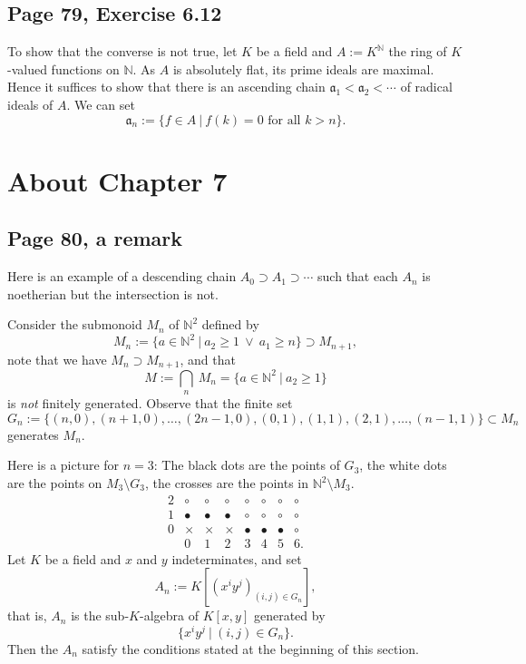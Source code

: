 \documentclass[parskip=half,fontsize=12pt]{scrartcl}%
\newcommand{\mf}{\mathfrak}
\newcommand{\aaa}{\mf a}
\begin{document}
\subsection{Page 79, Exercise 6.12}%

To show that the converse is not true, let $K$ be a field and $A:=K^{\mathbb N}$ the ring of $K$-valued functions on $\mathbb N$. As $A$ is absolutely flat, its prime ideals are maximal. Hence it suffices to show that there is an ascending chain $\aaa_1<\aaa_2<\cdots$ of radical ideals of $A$. We can set 
$$
\aaa_n:=\{f\in A\ |\ f(k)=0\text{ for all }k>n\}.
$$

\section{About Chapter 7}%

\subsection{Page 80, a remark}%

Here is an example of a descending chain $A_0\supset A_1\supset\cdots$ such that each $A_n$ is noetherian but the intersection is not.

Consider the submonoid $M_n$ of $\mathbb N^2$ defined by 
$$
M_n:=\{a\in\mathbb N^2\ |\ a_2\ge1\ \lor\ a_1\ge n\}\supset M_{n+1},
$$ 
note that we have $M_n\supset M_{n+1}$, and that 
$$
M:=\bigcap_n\ M_n=\{a\in\mathbb N^2\ |\ a_2\ge1\}
$$ 
is \emph{not} finitely generated. Observe that the finite set 
$$
G_n:=\{(n,0),(n+1,0),\dots,(2n-1,0),(0,1),(1,1),(2,1),\dots,(n-1,1)\}\subset M_n
$$ 
generates $M_n$. 

Here is a picture for $n=3$: The black dots are the points of $G_3$, the white dots are the points on $M_3\setminus G_3$, the crosses are the points in $\mathbb N^2\setminus M_3$.
$$
\begin{matrix}
2&\circ&\circ&\circ&\circ&\circ&\circ&\circ\\ 
1&\bullet&\bullet&\bullet&\circ&\circ&\circ&\circ\\ 
0&\times&\times&\times&\bullet&\bullet&\bullet&\circ\\ 
&0&1&2&3&4&5&6.
\end{matrix}
$$
Let $K$ be a field and $x$ and $y$ indeterminates, and set  
$$
A_n:=K\left[(x^iy^j)_{(i,j)\in G_n}\right],
$$ 
that is, $A_n$ is the sub-$K$-algebra of $K[x,y]$ generated by 
$$
\{x^iy^j\ |\ (i,j)\in G_n\}.
$$ 
Then the $A_n$ satisfy the conditions stated at the beginning of this section.
\end{document}
